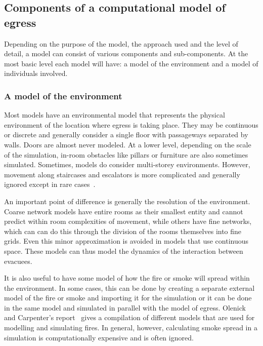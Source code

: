 \subsection{Components of a computational model of egress}
\label{LiteratureReview:ComponentsOfAModel}

Depending on the purpose of the model, the approach used and the level of detail, a model can consist of various components and sub-components. At the most basic level each model will have: a model of the environment and a model of individuals involved.

\subsubsection{A model of the environment}

Most models have an environmental model that represents the physical environment of the location where egress is taking place. They may be continuous or discrete and generally consider a single floor with passageways separated by walls. Doors are almost never modeled. At a lower level, depending on the scale of the simulation, in-room obstacles like pillars or furniture are also sometimes simulated. Sometimes, models do consider multi-storey environments. However, movement along staircases and escalators is more complicated and generally ignored except in rare cases~\cite{Kinsey:2009tg,Klupfel:2003waa}.


An important point of difference is generally the resolution of the environment. Coarse network models have entire rooms as their smallest entity and cannot predict within room complexities of movement, while others have fine networks, which can can do this through the division of the rooms themselves into fine grids. Even this minor approximation is avoided in models that use continuous space. These models can thus model the dynamics of the interaction between evacuees.

It is also useful to have some model of how the fire or smoke will spread within the environment. In some cases, this can be done by creating a separate external model of the fire or smoke and importing it for the simulation or it can be done in the same model and simulated in parallel with the model of egress. Olenick and Carpenter's report~\cite{Olenick:2003daa} gives a compilation of different models that are used for modelling and simulating fires. In general, however, calculating smoke spread in a simulation is computationally expensive and is often ignored.



